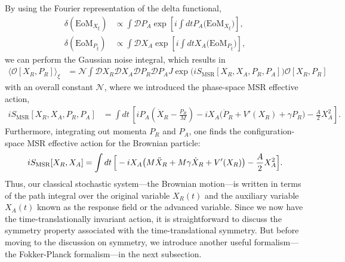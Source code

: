 \documentclass[a4paper,11pt]{article}
\begin{document}
By using the Fourier representation of the delta functional,
\begin{align}
 \delta(\mathrm{EoM}_{X_\xi})
 &\propto
 \int \mathcal{D}P_A 
 \exp\left[ i\int dt P_A \big( \mathrm{EoM}_{X_\xi} \big) \right],\\
 \delta(\mathrm{EoM}_{P_\xi})
 &\propto \int \mathcal{D} X_A 
 \exp \left[ i\int dt X_A \big( \mathrm{EoM}_{P_\xi} \big) \right] ,
\end{align}
we can perform the Gaussian noise integral, which results in 
\begin{equation}
 \begin{split}
  \langle \mathcal{O}[X_R,P_R] \rangle_\xi
  &= \mathcal N \int \mathcal{D} X_R \mathcal{D} X_A \mathcal{D} P_R  \mathcal{D} P_A J
  \exp \Big( iS_{\mathrm{MSR}} [X_R,X_A,P_R,P_A] \Big)
  \mathcal{O}[X_R,P_R]
 \end{split}
\end{equation}
with an overall constant $\mathcal N$,
where we introduced the phase-space MSR effective action, 
\begin{align}
 iS_{\mathrm{MSR}}[X_R,X_A,P_R,P_A] 
 &=\int dt\, \left[  i P_A \left( \dot{X}_R - \frac{P_R}{M} \right) 
 - i X_A \big(\dot P_R+ V'(X_R) + \gamma P_R  \big)
 - \frac{A}{2}X_A^2\right].
 \label{eq:MSR1}
 \end{align}
Furthermore, 
integrating out momenta $P_R$ and $P_A$, 
one finds the configuration-space MSR effective action 
for the Brownian particle:
\begin{align}
 iS_{\rm MSR}[X_{R},X_{A}]=\int dt\, 
 \Big[  -i X_A \big( M\ddot{X}_R + M \gamma\dot{X}_{R} + V'(X_{R})
  \big)  - \frac{A}{2}X_A^2 \Big]. \label{eq:MSR2}
\end{align}
Thus, our classical stochastic system---the Brownian motion---is written 
in terms of the path integral over the original variable $X_R(t)$ and 
the auxiliary variable $X_A(t)$ known as the response 
field
or the advanced variable.
Since we now have the time-translationally invariant action,
it is straightforward to discuss the symmetry property 
associated with the time-translational symmetry. 
But before moving to the discussion on symmetry, 
we introduce another useful formalism---the Fokker-Planck formalism---in 
the next subsection.
\end{document}
